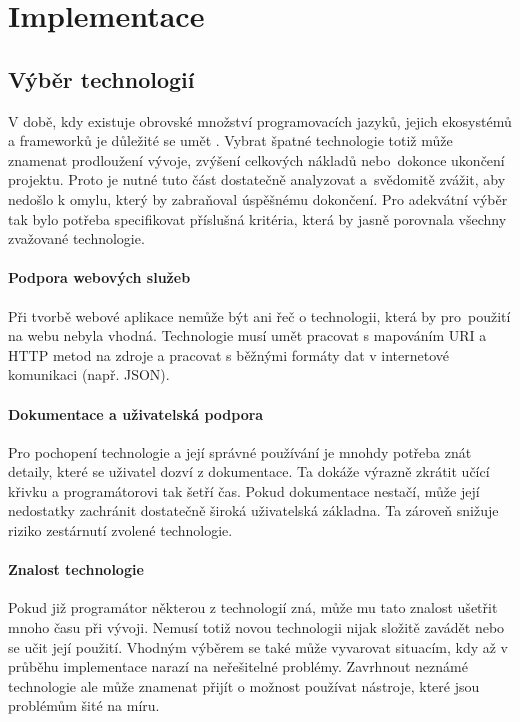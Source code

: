 \chapter{Implementace}

\section{Výběr technologií}

V době, kdy existuje obrovské množství programovacích jazyků, jejich ekosystémů a frameworků je důležité se umět . 
Vybrat špatné technologie totiž může znamenat prodloužení vývoje, zvýšení celkových nákladů nebo~dokonce ukončení projektu.
Proto je nutné tuto část dostatečně analyzovat a~svědomitě zvážit, aby nedošlo k omylu, který by zabraňoval úspěšnému dokončení.
Pro adekvátní výběr tak bylo potřeba specifikovat příslušná kritéria, která by jasně porovnala všechny zvažované technologie.

\subsubsection*{Podpora webových služeb}
Při tvorbě webové aplikace nemůže být ani řeč o technologii, která by pro~použití na webu nebyla vhodná. Technologie musí
umět pracovat s mapováním URI a HTTP metod na zdroje a pracovat s běžnými formáty dat v internetové komunikaci (např. JSON).

\subsubsection*{Dokumentace a uživatelská podpora}
Pro pochopení technologie a její správné používání je mnohdy potřeba znát detaily, které se uživatel dozví z dokumentace.
Ta dokáže výrazně zkrátit učící křivku a programátorovi tak šetří čas. Pokud dokumentace nestačí, může její
nedostatky zachránit dostatečně široká uživatelská základna. Ta zároveň snižuje riziko zestárnutí zvolené technologie.

\subsubsection*{Znalost technologie}
Pokud již programátor některou z technologií zná, může mu tato znalost ušetřit mnoho času při vývoji. Nemusí totiž novou technologii
nijak složitě zavádět nebo se učit její použití. Vhodným výběrem se také může vyvarovat situacím, kdy až v průběhu implementace narazí
na neřešitelné problémy. Zavrhnout neznámé technologie ale může znamenat přijít o možnost používat nástroje, které jsou problémům šité na míru. 

